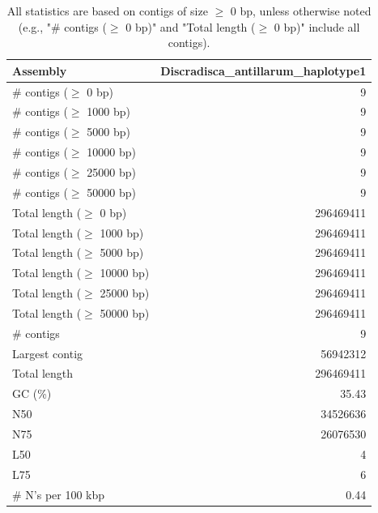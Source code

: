 \documentclass[12pt,a4paper]{article}
\begin{document}
\begin{table}[ht]
\begin{center}
\caption{All statistics are based on contigs of size $\geq$ 0 bp, unless otherwise noted (e.g., "\# contigs ($\geq$ 0 bp)" and "Total length ($\geq$ 0 bp)" include all contigs).}
\begin{tabular}{|l*{1}{|r}|}
\hline
Assembly & Discradisca\_antillarum\_haplotype1 \\ \hline
\# contigs ($\geq$ 0 bp) & 9 \\ \hline
\# contigs ($\geq$ 1000 bp) & 9 \\ \hline
\# contigs ($\geq$ 5000 bp) & 9 \\ \hline
\# contigs ($\geq$ 10000 bp) & 9 \\ \hline
\# contigs ($\geq$ 25000 bp) & 9 \\ \hline
\# contigs ($\geq$ 50000 bp) & 9 \\ \hline
Total length ($\geq$ 0 bp) & 296469411 \\ \hline
Total length ($\geq$ 1000 bp) & 296469411 \\ \hline
Total length ($\geq$ 5000 bp) & 296469411 \\ \hline
Total length ($\geq$ 10000 bp) & 296469411 \\ \hline
Total length ($\geq$ 25000 bp) & 296469411 \\ \hline
Total length ($\geq$ 50000 bp) & 296469411 \\ \hline
\# contigs & 9 \\ \hline
Largest contig & 56942312 \\ \hline
Total length & 296469411 \\ \hline
GC (\%) & 35.43 \\ \hline
N50 & 34526636 \\ \hline
N75 & 26076530 \\ \hline
L50 & 4 \\ \hline
L75 & 6 \\ \hline
\# N's per 100 kbp & 0.44 \\ \hline
\end{tabular}
\end{center}
\end{table}
\end{document}
